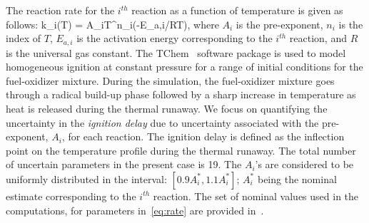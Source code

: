 The reaction rate for the $i^{th}$ reaction as a function of temperature
is given as follows:
\be
k_i(T) = A_iT^{n_i}\exp(-E_{a,i}/RT), 
\label{eq:rate}
\ee
%
where $A_i$ is the pre-exponent, $n_i$ is the index of $T$, $E_{a,i}$ is the
activation energy corresponding to the $i^{th}$ reaction, and $R$ is the
universal gas constant. 
The TChem~\cite{Safta:2011} software package is used to model homogeneous
ignition at constant pressure for a range of initial conditions for the
fuel-oxidizer mixture. During the simulation, the fuel-oxidizer mixture goes 
through a radical build-up phase followed by a sharp increase in temperature
as heat is released during the thermal runaway. We focus on quantifying the 
uncertainty in the \emph{ignition delay} due to uncertainty associated 
with the pre-exponent, $A_i$, for each reaction. The ignition delay 
is defined as the inflection point on the temperature profile during the thermal
runaway. The total number of uncertain parameters in the
present case is 19.  The $A_i$'s are considered to be uniformly distributed in
the interval: $[0.9A_i^\ast, 1.1A_i^\ast]$; $A_i^\ast$ being the nominal
estimate corresponding to the $i^{th}$ reaction.
The set of nominal values used in the computations, for parameters 
in~\eqref{eq:rate} are provided
in~\cite{Yetter:1991}. 

